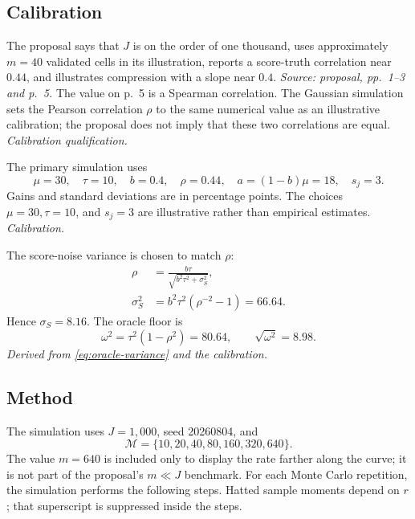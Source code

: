 \documentclass[11pt]{article}
\begin{document}
\subsection*{Calibration}

The proposal says that \(J\) is on the order of one thousand, uses
approximately \(m=40\) validated cells in its illustration, reports a
score-truth correlation near \(0.44\), and illustrates compression with a
slope near \(0.4\). \emph{Source: proposal, pp.~1--3 and p.~5.}
The value on p.~5 is a Spearman correlation. The Gaussian simulation sets the
Pearson correlation \(\rho\) to the same numerical value as an illustrative
calibration; the proposal does not imply that these two correlations are
equal. \emph{Calibration qualification.}

The primary simulation uses
\begin{equation}
 \mu=30,
 \quad
 \tau=10,
 \quad
 b=0.4,
 \quad
 \rho=0.44,
 \quad
 a=(1-b)\mu=18,
 \quad
 s_j=3.
 \label{eq:calibration}
\end{equation}
Gains and standard deviations are in percentage points. The choices
\(\mu=30,\tau=10\), and \(s_j=3\) are illustrative rather than empirical
estimates. \emph{Calibration.}

The score-noise variance is chosen to match \(\rho\):
\begin{align}
 \rho
 &=\frac{b\tau}{\sqrt{b^2\tau^2+\sigma_S^2}}, \\
 \sigma_S^2
 &=b^2\tau^2(\rho^{-2}-1)
 =66.64.
 \label{eq:score-noise-calibration}
\end{align}
Hence \(\sigma_S=8.16\). The oracle floor is
\begin{equation}
 \omega^2
 =\tau^2(1-\rho^2)
 =80.64,
 \qquad
 \sqrt{\omega^2}=8.98.
 \label{eq:simulation-floor}
\end{equation}
\emph{Derived from \eqref{eq:oracle-variance} and the calibration.}

\subsection*{Method}

The simulation uses \(J=1{,}000\), seed 20260804, and
\begin{equation}
 \mathcal M=\{10,20,40,80,160,320,640\}.
 \label{eq:m-grid}
\end{equation}
The value \(m=640\) is included only to display the rate farther along the
curve; it is not part of the proposal's \(m\ll J\) benchmark. For each Monte
Carlo repetition, the simulation performs the following steps. Hatted sample
moments depend on \(r\); that superscript is suppressed inside the steps.
\end{document}

